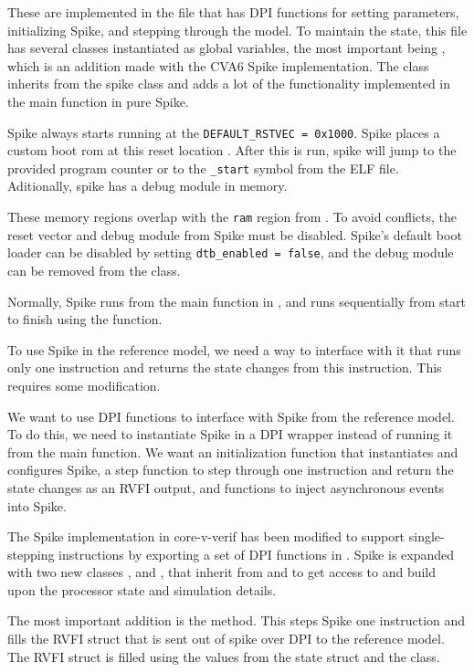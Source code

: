
These are implemented in the  file that has DPI functions for setting parameters, initializing Spike, and stepping through the model. To maintain the state, this file has several classes instantiated as global variables, the most important being , which is an addition made with the CVA6 Spike implementation. The  class inherits from the spike  class and adds a lot of the functionality implemented in the main function in pure Spike.  



Spike always starts running at the \lstinline{DEFAULT_RSTVEC = 0x1000}. Spike places a custom boot rom at this reset location \cite{evancoxAddDocumentationLowlevel2017}.
After this is run, spike will jump to the provided program counter or to the \lstinline{_start} symbol from the ELF file. Aditionally, spike has a debug module in memory.


These memory regions overlap with the \lstinline{ram} region from .
To avoid conflicts, the reset vector and debug module from Spike must be disabled. Spike's default boot loader can be disabled by setting \lstinline{dtb_enabled = false}, and the debug module can be removed from the  class.





Normally, Spike runs from the main function in , and runs sequentially from start to finish using the  function.

To use Spike in the reference model, we need a way to interface with it that runs only one instruction and returns the state changes from this instruction. This requires some modification. 

We want to use DPI functions to interface with Spike from the reference model. To do this, we need to instantiate Spike in a DPI wrapper instead of running it from the main function. We want an initialization function that instantiates and configures Spike, a step function to step through one instruction and return the state changes as an RVFI output, and functions to inject asynchronous events into Spike.

The Spike implementation in core-v-verif has been modified to support single-stepping instructions by exporting a set of DPI functions in . Spike is expanded with two new classes , and , that inherit from  and  to get access to and build upon the processor state and simulation details.

The most important addition is the  method. This steps Spike one instruction and fills the  RVFI struct that is sent out of spike over DPI to the reference model. The RVFI struct is filled using the values from the  state struct and the  class.

